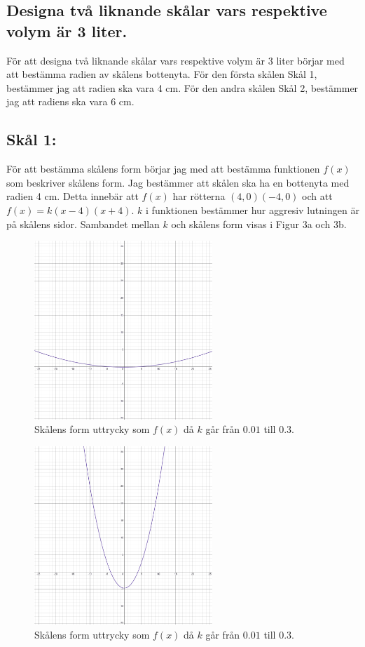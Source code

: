 \documentclass[12pt]{article}
\begin{document}
\subsection*{Designa två liknande skålar vars respektive volym är 3 liter.}
För att designa två liknande skålar vars respektive volym är 3 liter börjar med att bestämma radien av skålens bottenyta. För den första skålen Skål 1, bestämmer jag att radien ska vara 4 cm. För den andra skålen Skål 2, bestämmer jag att radiens ska vara 6 cm.
\subsection*{Skål 1:}
För att bestämma skålens form börjar jag med att bestämma funktionen $f(x)$ som beskriver skålens form. Jag bestämmer att skålen ska ha en bottenyta med radien 4 cm. Detta innebär att $f(x)$ har rötterna $(4,0) (-4,0)$ och att $f(x)=k(x-4)(x+4)$. $k$ i funktionen bestämmer hur aggresiv lutningen är på skålens sidor. Sambandet mellan $k$ och skålens form visas i Figur 3a och 3b.\\
\begin{figure}[H]
    \centering
    \renewcommand{\thefigure}{3a}
    \includegraphics[width=0.6\textwidth]{figur3a.png}
    \caption{Skålens form uttrycky som $f(x)$ då $k$ går från $0.01$ till $0.3$.}
\end{figure}
\begin{figure}[H]
    \centering
    \renewcommand{\thefigure}{3b}
    \includegraphics[width=0.6\textwidth]{figur3b.png}
    \caption{Skålens form uttrycky som $f(x)$ då $k$ går från $0.01$ till $0.3$.}
\end{figure}
\end{document}
